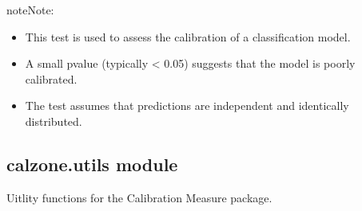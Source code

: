 \documentclass[letterpaper,10pt,english]{sphinxmanual}
\begin{document}
\begin{fulllineitems}
\begin{quote}
\begin{description}
\end{description}\end{quote}

\begin{sphinxadmonition}{note}{Note:}\begin{itemize}
\item {} 
\sphinxAtStartPar
This test is used to assess the calibration of a classification model.

\item {} 
\sphinxAtStartPar
A small p\sphinxhyphen{}value (typically \textless{} 0.05) suggests that the model is poorly calibrated.

\item {} 
\sphinxAtStartPar
The test assumes that predictions are independent and identically distributed.

\end{itemize}
\end{sphinxadmonition}

\end{fulllineitems}



\subsection{calzone.utils module}
\label{\detokenize{calzone:module-calzone.utils}}\label{\detokenize{calzone:calzone-utils-module}}
\sphinxAtStartPar
Uitlity functions for the Calibration Measure package.
\end{document}
